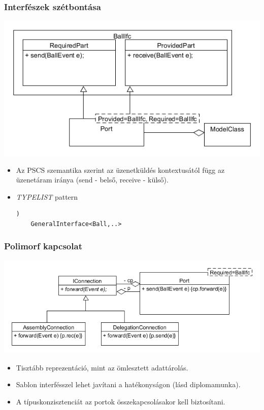 \documentclass[11pt]{beamer}
\begin{document}
\begin{frame}[fragile]
	\frametitle{Interfészek szétbontása}
	\begin{center}
	\includegraphics[scale=0.5]{vedes_demo_interface_send_rec.png}
	\end{center}
	\begin{itemize}
	\item Az PSCS szemantika szerint az üzenetküldés kontextusától függ az üzenetáram iránya (send - belső, receive - külső).
	\item \textit{TYPELIST} pattern
	\begin{lstlisting}[basicstyle=\small])
	GeneralInterface<Ball,..> 
	\end{lstlisting}
	\end{itemize}
\end{frame}

\begin{frame}
	\frametitle{Polimorf kapcsolat}
	\begin{center}
	\includegraphics[scale=0.5]{vedes_demo_connpolygref.png}
	\end{center}
	\begin{itemize}
	\item Tisztább reprezentáció, mint az ömlesztett adattárolás.
	\item Sablon interfésszel lehet javítani a hatékonyságon (lásd diplomamunka).
	\item A típuskonzisztenciát az portok összekapcsolásakor kell biztosítani.
	\end{itemize}
		
\end{frame}
\end{document}

